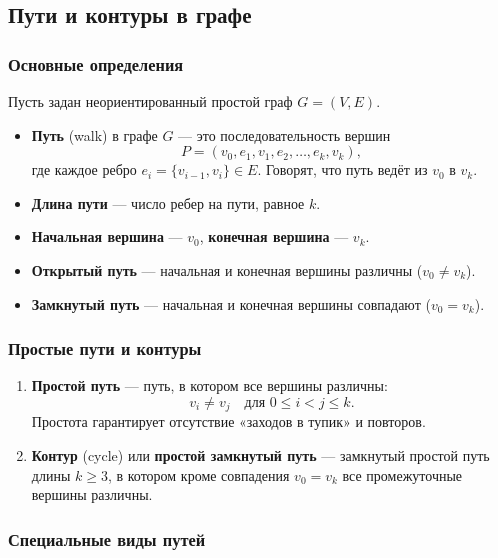 \subsection{Пути и контуры в графе}

\subsubsection{Основные определения}

Пусть задан неориентированный простой граф $G=(V,E)$.

\begin{itemize}[leftmargin=*]
  \item \textbf{Путь} (walk) в графе $G$ — это последовательность вершин
  \[
    P = (v_0, e_1, v_1, e_2, \dots, e_k, v_k),
  \]
  где каждое ребро $e_i = \{v_{i-1},v_i\}\in E$. Говорят, что путь ведёт из $v_0$ в $v_k$.
  \item \textbf{Длина пути} — число ребер на пути, равное $k$.
  \item \textbf{Начальная вершина} — $v_0$, \textbf{конечная вершина} — $v_k$.
  \item \textbf{Открытый путь} — начальная и конечная вершины различны ($v_0 \neq v_k$).
  \item \textbf{Замкнутый путь} — начальная и конечная вершины совпадают ($v_0 = v_k$).
\end{itemize}

\subsubsection{Простые пути и контуры}

\begin{enumerate}[label=\arabic*)]
  \item \textbf{Простой путь} — путь, в котором все вершины различны:
  \[
    v_i \neq v_j \quad\text{для }0\le i<j\le k.
  \]
  Простота гарантирует отсутствие «заходов в тупик» и повторов.
  \item \textbf{Контур} (cycle) или \textbf{простой замкнутый путь} — замкнутый простой путь длины $k\ge3$, в котором кроме совпадения $v_0=v_k$ все промежуточные вершины различны.
\end{enumerate}

\subsubsection{Специальные виды путей}

